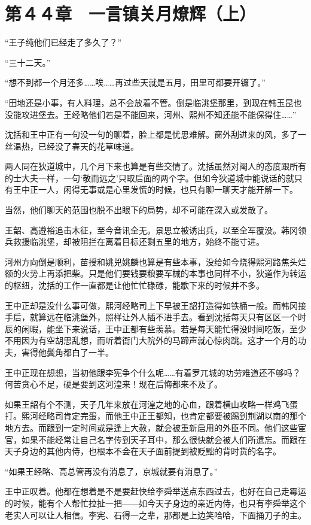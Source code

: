 \section{第４４章　一言镇关月燎辉（上）}

“王子纯他们已经走了多久了？”

“三十二天。”

“想不到都一个月还多……唉……再过些天就是五月，田里可都要开镰了。”

“田地还是小事，有人料理，总不会放着不管。倒是临洮堡那里，到现在韩玉昆也没能攻进堡去。王经略他们若是不能回来，河州、熙州不知还能不能保得住……”

沈括和王中正有一句没一句的聊着，脸上都是忧思难解。窗外刮进来的风，多了一丝温热，已经没了春天的花草味道。

两人同在狄道城中，几个月下来也算是有些交情了。沈括虽然对阉人的态度跟所有的士大夫一样，一句‘敬而远之’只取后面的两个字。但如今狄道城中能说话的就只有王中正一人，闲得无事或是心里发慌的时候，也只有聊一聊天才能开解一下。

当然，他们聊天的范围也脱不出眼下的局势，却不可能在深入或发散了。

王韶、高遵裕追击木征，至今音讯全无。景思立被诱出兵，以至全军覆没。韩冈领兵救援临洮堡，却被阻拦在离着目标还剩五里的地方，始终不能寸进。

河州方向倒是顺利，苗授和姚兕姚麟也算是有些本事，没给如今烧得熙河路焦头烂额的火势上再添把柴。只是他们要钱要粮要军械的本事也同样不小，狄道作为转运的枢纽，沈括的工作一直都是让他忙忙碌碌，能歇下来的时候并不多。

王中正却是没什么事可做，熙河经略司上下早被王韶打造得如铁桶一般。而韩冈接手后，就算远在临洮堡外，照样让外人插不进手去。看到沈括每天只有区区一个时辰的闲暇，能坐下来说话，王中正都有些羡慕。若是每天能忙得没时间吃饭，至少不用因为有空胡思乱想，而听着衙门大院外的马蹄声就心惊肉跳。这才一个月的功夫，害得他鬓角都白了一半。

王中正现在想想，当初他跟李宪争个什么呢……有着罗兀城的功劳难道还不够吗？何苦贪心不足，硬是要到这河湟来！现在后悔都来不及了。

如果王韶有个不测，天子几年来放在河湟之地的心血，跟着横山攻略一样鸡飞蛋打。熙河经略司肯定完蛋，而他王中正王都知，也肯定都要被踢到荆湖以南的那个地方去。而跟到一定时间或是逢上大赦，就会被重新启用的外臣不同。他们这些宦官，如果不能经常让自己名字传到天子耳中，那么很快就会被人们所遗忘。而跟在天子身边的其他内侍，也根本不会在天子面前提到被贬黜的背时货的名字。

“如果王经略、高总管再没有消息了，京城就要有消息了。”

王中正叹着。他都在想着是不是要赶快给李舜举送点东西过去，也好在自己走霉运的时候，能有个人帮忙拉扯一把——如今天子身边的亲近内侍，也只有李舜举这个老实人可以让人相信。李宪、石得一之辈，那都是上边笑哈哈，下面捅刀子的主。

